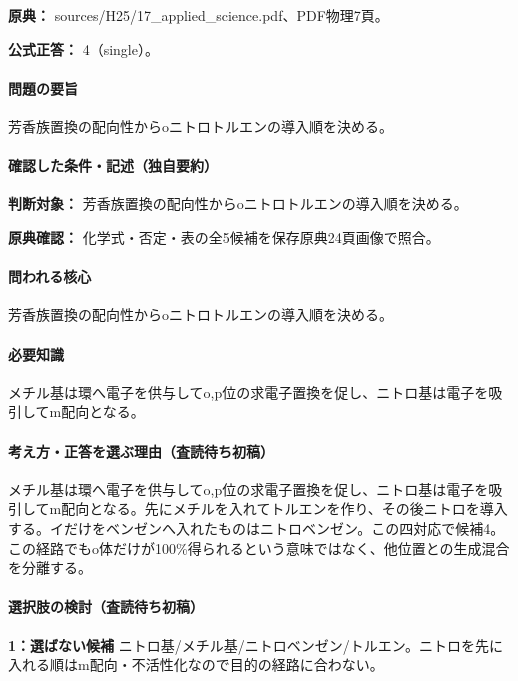 \noindent\textbf{原典：} sources/H25/17\_applied\_science.pdf、PDF物理7頁。

\textbf{公式正答：} 4（single）。

\paragraph{問題の要旨} 芳香族置換の配向性からoニトロトルエンの導入順を決める。

\paragraph{確認した条件・記述（独自要約）}\mbox{}\par

\noindent\textbf{判断対象：} 芳香族置換の配向性からoニトロトルエンの導入順を決める。\par

\noindent\textbf{原典確認：} 化学式・否定・表の全5候補を保存原典24頁画像で照合。\par

\paragraph{問われる核心} 芳香族置換の配向性からoニトロトルエンの導入順を決める。

\paragraph{必要知識} メチル基は環へ電子を供与してo,p位の求電子置換を促し、ニトロ基は電子を吸引してm配向となる。

\paragraph{考え方・正答を選ぶ理由（査読待ち初稿）} メチル基は環へ電子を供与してo,p位の求電子置換を促し、ニトロ基は電子を吸引してm配向となる。先にメチルを入れてトルエンを作り、その後ニトロを導入する。イだけをベンゼンへ入れたものはニトロベンゼン。この四対応で候補4。この経路でもo体だけが100\%得られるという意味ではなく、他位置との生成混合を分離する。

\paragraph{選択肢の検討（査読待ち初稿）}\mbox{}\par

\noindent\textbf{1：選ばない候補} ニトロ基/メチル基/ニトロベンゼン/トルエン。ニトロを先に入れる順はm配向・不活性化なので目的の経路に合わない。\par

